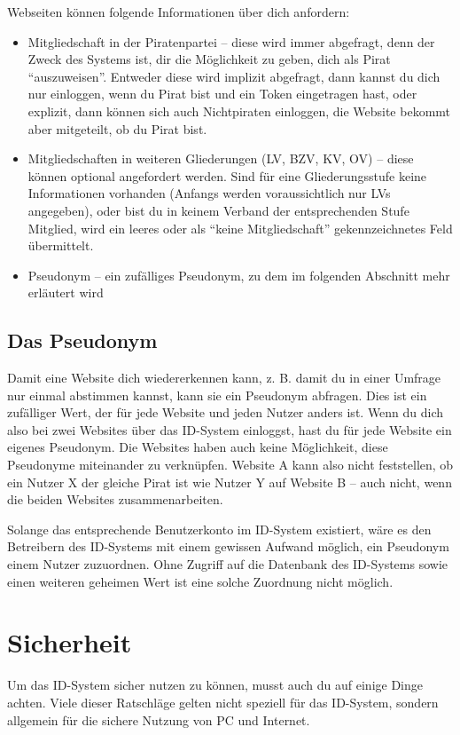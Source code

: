 Webseiten können folgende Informationen über dich anfordern:
\begin{itemize}
	\item Mitgliedschaft in der Piratenpartei -- diese wird immer abgefragt, denn der Zweck des Systems ist, dir die Möglichkeit zu geben, dich als Pirat "`auszuweisen"'.
		Entweder diese wird implizit abgefragt, dann kannst du dich nur einloggen, wenn du Pirat bist und ein Token eingetragen hast,
		oder explizit, dann können sich auch Nichtpiraten einloggen, die Website bekommt aber mitgeteilt, ob du Pirat bist.
	
	\item Mitgliedschaften in weiteren Gliederungen (LV, BZV, KV, OV) -- diese können optional angefordert werden.
		Sind für eine Gliederungsstufe keine Informationen vorhanden (Anfangs werden voraussichtlich nur LVs angegeben),
		oder bist du in keinem Verband der entsprechenden Stufe Mitglied,
		wird ein leeres oder als "`keine Mitgliedschaft"' gekennzeichnetes Feld übermittelt.
		
	\item Pseudonym -- ein zufälliges Pseudonym, zu dem im folgenden Abschnitt mehr erläutert wird
\end{itemize}

\subsection{Das Pseudonym}
Damit eine Website dich wiedererkennen kann, z. B. damit du in einer Umfrage nur einmal abstimmen kannst, kann sie ein Pseudonym abfragen.
Dies ist ein zufälliger Wert, der für jede Website und jeden Nutzer anders ist.
Wenn du dich also bei zwei Websites über das ID-System einloggst, hast du für jede Website ein eigenes Pseudonym.
Die Websites haben auch keine Möglichkeit, diese Pseudonyme miteinander zu verknüpfen.
Website A kann also nicht feststellen, ob ein Nutzer X der gleiche Pirat ist wie Nutzer Y auf Website B -- auch nicht, wenn die beiden Websites zusammenarbeiten.

Solange das entsprechende Benutzerkonto im ID-System existiert, wäre es den Betreibern des ID-Systems mit einem gewissen Aufwand möglich, ein Pseudonym einem Nutzer zuzuordnen.
Ohne Zugriff auf die Datenbank des ID-Systems sowie einen weiteren geheimen Wert ist eine solche Zuordnung nicht möglich.

\newpage
\section{Sicherheit}
Um das ID-System sicher nutzen zu können, musst auch du auf einige Dinge achten.
Viele dieser Ratschläge gelten nicht speziell für das ID-System, sondern allgemein für die sichere Nutzung von PC und Internet.

